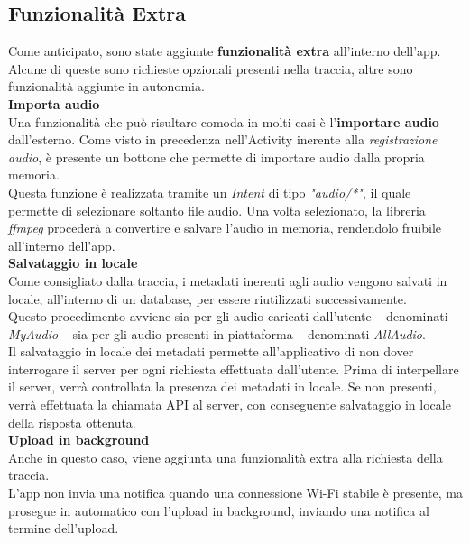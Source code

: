 \documentclass{article}
\begin{document}
\pagebreak

\subsection*{Funzionalità Extra}
\large

Come anticipato, sono state aggiunte \textbf{funzionalità extra} all'interno dell'app. Alcune di queste sono richieste opzionali presenti nella traccia, altre sono funzionalità aggiunte in autonomia.\vspace*{14pt}\\
\textbf{Importa audio}\\
Una funzionalità che può risultare comoda in molti casi è l'\textbf{importare audio} dall'esterno. Come visto in precedenza nell'Activity inerente alla \textit{registrazione audio}, è presente un bottone che permette di importare audio dalla propria memoria.\\
Questa funzione è realizzata tramite un \textit{Intent} di tipo \textit{"audio/*"}, il quale permette di selezionare soltanto file audio. Una volta selezionato, la libreria \textit{ffmpeg} procederà a convertire e salvare l'audio in memoria, rendendolo fruibile all'interno dell'app.
\vspace*{14pt}\\
\textbf{Salvataggio in locale}\\
Come consigliato dalla traccia, i metadati inerenti agli audio vengono salvati in locale, all'interno di un database, per essere riutilizzati successivamente.\\
Questo procedimento avviene sia per gli audio caricati dall'utente -- denominati \textit{MyAudio} -- sia per gli audio presenti in piattaforma -- denominati \textit{AllAudio}.\vspace*{14pt}\\
Il salvataggio in locale dei metadati permette all'applicativo di non dover interrogare il server per ogni richiesta effettuata dall'utente. Prima di interpellare il server, verrà controllata la presenza dei metadati in locale. Se non presenti, verrà effettuata la chiamata API al server, con conseguente salvataggio in locale della risposta ottenuta.\vspace*{14pt}\\
\textbf{Upload in background}\\
Anche in questo caso, viene aggiunta una funzionalità extra alla richiesta della traccia.\\
L'app non invia una notifica quando una connessione Wi-Fi stabile è presente, ma prosegue in automatico con l'upload in background, inviando una notifica al termine dell'upload.\vspace*{14pt}\\
\end{document}
